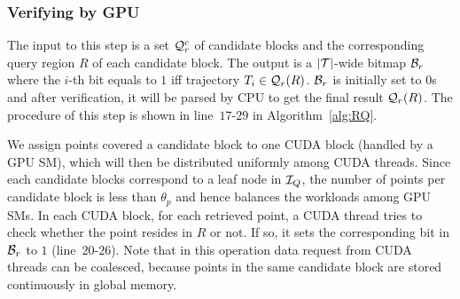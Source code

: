 \documentclass[10pt,conference,letterpaper]{IEEEtran}
\newcommand{\rangeq}{{{\cal Q}_r}\xspace}
\newcommand{\rangecand}{{{\cal Q}_r^c}\xspace}
\newcommand{\alltraj}{{{\cal T}}\xspace}
\newcommand{\trajtable}{{\cal S}\xspace}
\newcommand{\treeindex}{{{\cal I}_Q}\xspace}
\begin{document}
%



\subsubsection{Verifying by GPU}

The input to this step is a set $\rangecand$ of candidate blocks and the corresponding query region $R$ of each candidate block. The output is a $|\alltraj|$-wide bitmap ${\cal B}_r$ where the $i$-th bit equals to $1$ iff trajectory $T_i\in \rangeq(R)$. ${\cal B}_r$ is initially set to $0$s and after verification, it will be parsed by CPU to get the final result $\rangeq(R)$. The procedure of this step is shown in line~$17$-$29$ in Algorithm~\ref{alg:RQ}.

%
%
We assign points covered a candidate block to one CUDA block (handled by a GPU SM), which will then be distributed uniformly among CUDA threads. Since each candidate blocks correspond to a leaf node in $\treeindex$, the number of points per candidate block is less than $\theta_p$ and hence balances the workloads among GPU SMs. In each CUDA block, for each retrieved point, a CUDA thread tries to check whether the point resides in $R$ or not. If so, it sets the corresponding bit in ${\cal B}_r$ to $1$ (line~$20$-$26$). Note that in this operation data request from CUDA threads can be coalesced, because points in the same candidate block are stored continuously in global memory.
\end{document}
